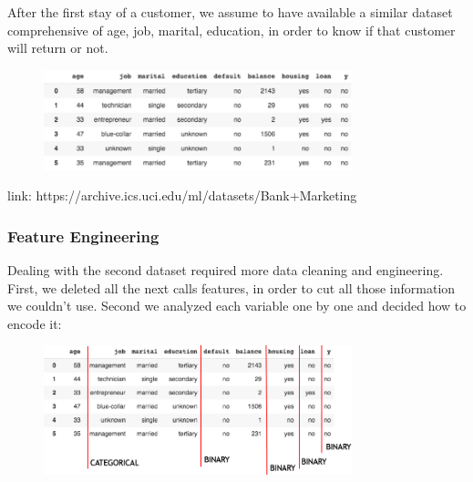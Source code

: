 After the first stay of a customer, we assume to have available a similar dataset comprehensive of age, job, marital, education, in order to know if that customer will return or not.

\begin{figure}[H]
\centering
\includegraphics[width=0.8\textwidth]{Img/bank_dataset.png}
\end{figure}

link: https://archive.ics.uci.edu/ml/datasets/Bank+Marketing

\newpage
\subsubsection{Feature Engineering}
Dealing with the second dataset required more data cleaning and engineering. First, we deleted all the next calls features, in order to cut all those information we couldn't use. Second we analyzed each variable one by one and decided how to encode it:
\begin{figure}[H]
\centering
\includegraphics[width=0.8\textwidth]{Img/feature_recap.png}
\end{figure}

